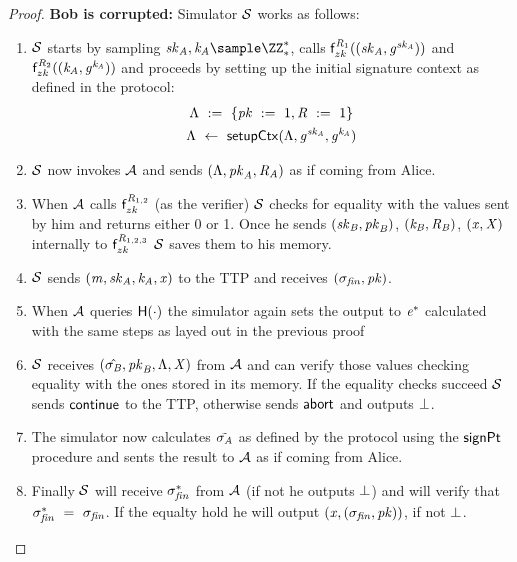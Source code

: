 \begin{proof}
    \textbf{Bob is corrupted: } Simulator $\mathcal{S}$ works as follows:
    \begin{enumerate}
        \item $\mathcal{S}$ starts by sampling $\varSecKeyAlice, \varNonceAlice \sample \cnstIntegersPrimeWithoutZero{*}$, calls $\mathsf{f}^{\mathit{R}_1}_{zk}((\mathit{sk}_{\mathit{A}}, \mathit{g}^{\mathit{sk}_{\mathit{A}}}))$ and $\mathsf{f}^{\mathit{R}_2}_{zk}((\mathit{\mathit{k}_{\mathit{A}}}, \mathit{g}^{\mathit{\mathit{k}_{\mathit{A}}}}))$ and proceeds by setting up the initial signature context as defined in the protocol:
        \begin{gather*}
            \Lambda ~:=~ \{ \mathit{pk} ~:=~ 1, \mathit{R} ~:=~ 1 \} \\
            \Lambda ~\leftarrow~ \mathsf{setupCtx}( \Lambda, \mathit{g}^{\mathit{sk}_{\mathit{A}}}, \mathit{g}^{\mathit{\mathit{k}_{\mathit{A}}}} ) \\
        \end{gather*}
        \item $\mathcal{S}$ now invokes $\mathcal{A}$ and sends $(\Lambda, \mathit{pk}_{\mathit{A}}, \mathit{R}_{\mathit{A}})$ as if coming from Alice.
        \item When $\mathcal{A}$ calls $\mathsf{f}^{\mathit{R}_{1,2}}_{zk}$ (as the verifier) $\mathcal{S}$ checks for equality with the values sent by him and returns either 0 or 1.
        Once he sends $(\mathit{sk}_{\mathit{B}}, \mathit{pk}_{\mathit{B}})$, $(\mathit{\mathit{k}_{\mathit{B}}}, \mathit{R}_{\mathit{B}})$, $(\mathit{x}, \mathit{X})$ internally to $\mathsf{f}^{\mathit{R}_{1,2,3}}_{zk}$ $\mathcal{S}$ saves them to his memory.
        \item $\mathcal{S}$ sends $(\mathit{m}, \mathit{sk}_{\mathit{A}}, \mathit{\mathit{k}_{\mathit{A}}}, \mathit{x})$ to the TTP and receives $(\sigma_{\mathit{fin}}, \mathit{pk})$.
        \item When $\mathcal{A}$ queries $\mathsf{H} (\cdot)$ the simulator again sets the output to $\mathit{e}^*$ calculated with the same steps as layed out in the previous proof
        \item $\mathcal{S}$ receives $(\hat{\sigma_{\mathit{B}}}, \mathit{pk}_{\mathit{B}}, \Lambda, \mathit{X})$ from $\mathcal{A}$ and can verify those values checking equality with the ones stored in its memory.
        If the equality checks succeed $\mathcal{S}$ sends $\mathsf{continue}$ to the TTP, otherwise sends $\mathsf{abort}$ and outputs $\bot$.
        \item The simulator now calculates $\tilde{\sigma_{\mathit{A}}}$ as defined by the protocol using the $\mathsf{signPt}$ procedure and sents the result to $\mathcal{A}$ as if coming from Alice.
        \item Finally $\mathcal{S}$ will receive $\sigma_{\mathit{fin}}^*$ from $\mathcal{A}$ (if not he outputs $\bot$) and will verify that $\sigma_{\mathit{fin}}^* ~=~ \sigma_{\mathit{fin}}$.
        If the equalty hold he will output $(\mathit{x}, (\sigma_{\mathit{fin}}, \mathit{pk}))$, if not $\bot$.
    \end{enumerate}
\end{proof}